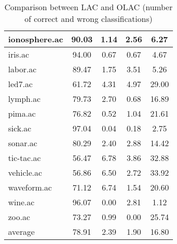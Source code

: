 \begin{table}[htbp]
\begin{tabular}{|l|c|c|c|c|}
		\hline
		ionosphere.ac   & 90.03         & 1.14               & 2.56                     & 6.27                          \\
		\hline
		iris.ac         & 94.00         & 0.67               & 0.67                     & 4.67                          \\
		\hline
		labor.ac        & 89.47         & 1.75               & 3.51                     & 5.26                          \\
		\hline
		led7.ac         & 61.72         & 4.31               & 4.97                     & 29.00                         \\
		\hline
		lymph.ac        & 79.73         & 2.70               & 0.68                     & 16.89                         \\
		\hline
		pima.ac         & 76.82         & 0.52               & 1.04                     & 21.61                         \\
		\hline
		sick.ac         & 97.04         & 0.04               & 0.18                     & 2.75                          \\
		\hline
		sonar.ac        & 80.29         & 2.40               & 2.88                     & 14.42                         \\
		\hline
		tic-tac.ac      & 56.47         & 6.78               & 3.86                     & 32.88                         \\
		\hline
		vehicle.ac      & 56.86         & 6.50               & 2.72                     & 33.92                         \\
		\hline
		waveform.ac     & 71.12         & 6.74               & 1.54                     & 20.60                         \\
		\hline
		wine.ac         & 96.07         & 0.00               & 2.81                     & 1.12                          \\
		\hline
		zoo.ac          & 73.27         & 0.99               & 0.00                     & 25.74                         \\
		\hline
		average         & 78.91         & 2.39               & 1.90                     & 16.80                         \\
		\hline
		\end{tabular}
	\caption{Comparison between LAC and OLAC (number of correct and wrong classifications)}
	\label{tab:comparison_lac_olac}
\end{table}